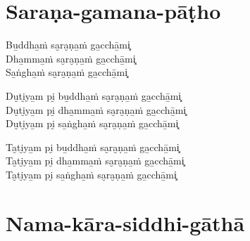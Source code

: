 \chapter{Saraṇa-gamana-pāṭho}


\begin{paritta}
Bu̱ddha̱ṁ sa̮ra̮ṇa̱ṁ ga̱cchā̱mi͓\\
Dha̱mma̱ṁ sa̮ra̮ṇa̱ṁ ga̱cchā̱mi͓\\
Sa̱ṅgha̱ṁ sa̮ra̮ṇa̱ṁ ga̱cchā̱mi͓

Du̮ti̮ya̱m pi̮ bu̱ddha̱ṁ sa̮ra̮ṇa̱ṁ ga̱cchā̱mi͓\\
Du̮ti̮ya̱m pi̮ dha̱mma̱ṁ sa̮ra̮ṇa̱ṁ ga̱cchā̱mi͓\\
Du̮ti̮ya̱m pi̮ sa̱ṅgha̱ṁ sa̮ra̮ṇa̱ṁ ga̱cchā̱mi͓

Ta̮ti̮ya̱m pi̮ bu̱ddha̱ṁ sa̮ra̮ṇa̱ṁ ga̱cchā̱mi͓\\
Ta̮ti̮ya̱m pi̮ dha̱mma̱ṁ sa̮ra̮ṇa̱ṁ ga̱cchā̱mi͓\\
Ta̮ti̮ya̱m pi̮ sa̱ṅgha̱ṁ sa̮ra̮ṇa̱ṁ ga̱cchā̱mi͓
\end{paritta}

\clearpage

\chapter{Nama-kāra-siddhi-gāthā}



